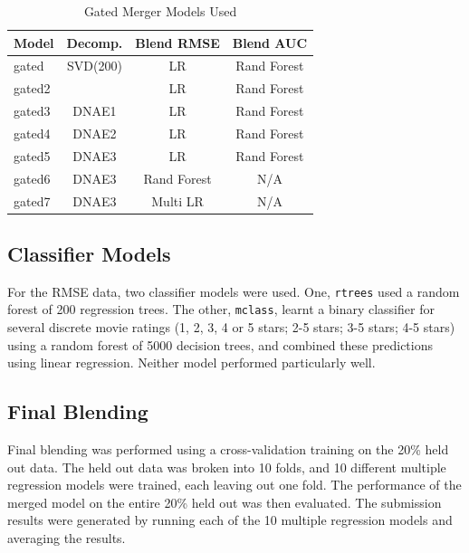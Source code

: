 \documentclass{article}
\begin{document}
\begin{table}
\caption{Gated Merger Models Used}
\label{table:gated-models}
\vskip 0.15in
\begin{center}
\begin{small}
\begin{sc}
\begin{tabular}{lccc}
\hline
\abovespace\belowspace
Model & Decomp. & Blend RMSE & Blend AUC \\
\hline
\abovespace
gated   & SVD(200)  & LR & Rand Forest  \\
gated2  &           & LR & Rand Forest  \\
gated3  & DNAE1     & LR & Rand Forest  \\
gated4  & DNAE2     & LR & Rand Forest  \\
gated5  & DNAE3     & LR & Rand Forest  \\
gated6  & DNAE3     & Rand Forest & N/A  \\
\belowspace
gated7  & DNAE3     & Multi LR & N/A   \\
\hline
\end{tabular}
\end{sc}
\end{small}
\end{center}
\vskip -0.1in
\end{table}

\subsection{Classifier Models}

For the RMSE data, two classifier models were used.  One, \texttt{rtrees} used a random forest of 200 regression trees.  The other, \texttt{mclass}, learnt a binary classifier for several discrete movie ratings (1, 2, 3, 4 or 5 stars; 2-5 stars; 3-5 stars; 4-5 stars) using a random forest of 5000 decision trees, and combined these predictions using linear regression.  Neither model performed particularly well.

\subsection{Final Blending}

Final blending was performed using a cross-validation training on the 20\% held out data.  The held out data was broken into 10 folds, and 10 different multiple regression models were trained, each leaving out one fold.  The performance of the merged model on the entire 20\% held out was then evaluated.  The submission results were generated by running each of the 10 multiple regression models and averaging the results.
\end{document}
